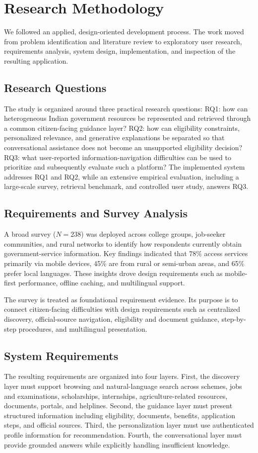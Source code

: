 \documentclass[conference]{IEEEtran}
\begin{document}
\section{Research Methodology}
We followed an applied, design-oriented development process. The work moved from problem identification and literature review to exploratory user research, requirements analysis, system design, implementation, and inspection of the resulting application.

\subsection{Research Questions}
The study is organized around three practical research questions: RQ1: how can heterogeneous Indian government resources be represented and retrieved through a common citizen-facing guidance layer? RQ2: how can eligibility constraints, personalized relevance, and generative explanations be separated so that conversational assistance does not become an unsupported eligibility decision? RQ3: what user-reported information-navigation difficulties can be used to prioritize and subsequently evaluate such a platform? The implemented system addresses RQ1 and RQ2, while an extensive empirical evaluation, including a large-scale survey, retrieval benchmark, and controlled user study, answers RQ3.

\subsection{Requirements and Survey Analysis}
A broad survey ($N=238$) was deployed across college groups, job-seeker communities, and rural networks to identify how respondents currently obtain government-service information. Key findings indicated that 78\% access services primarily via mobile devices, 45\% are from rural or semi-urban areas, and 65\% prefer local languages. These insights drove design requirements such as mobile-first performance, offline caching, and multilingual support.

The survey is treated as foundational requirement evidence. Its purpose is to connect citizen-facing difficulties with design requirements such as centralized discovery, official-source navigation, eligibility and document guidance, step-by-step procedures, and multilingual presentation.

\subsection{System Requirements}
The resulting requirements are organized into four layers. First, the discovery layer must support browsing and natural-language search across schemes, jobs and examinations, scholarships, internships, agriculture-related resources, documents, portals, and helplines. Second, the guidance layer must present structured information including eligibility, documents, benefits, application steps, and official sources. Third, the personalization layer must use authenticated profile information for recommendation. Fourth, the conversational layer must provide grounded answers while explicitly handling insufficient knowledge.
\end{document}
